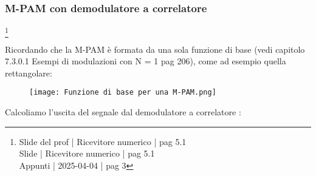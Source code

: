 \newpage 

\subsubsection{M-PAM con demodulatore a correlatore}
\footnote{Slide del prof | Ricevitore numerico | pag 5.1 \\  
Slide | Ricevitore numerico | pag 5.1 \\
Appunti | 2025-04-04 | pag 3
}

Ricordando che la M-PAM è formata da una sola funzione di base 
(vedi capitolo 7.3.0.1 Esempi di modulazioni con N = 1 pag 206), 
come ad esempio quella rettangolare: 

\begin{figure}[h]
    \centering
    \texttt{[image: Funzione di base per una M-PAM.png]}
\end{figure} 

Calcoliamo l'uscita del segnale dal demodulatore a correlatore : 

